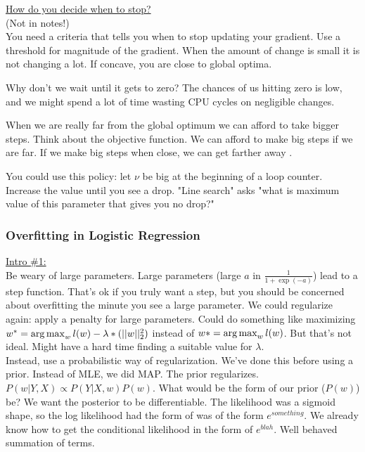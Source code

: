 \underline{How do you decide when to stop?} \hfill \\
(Not in notes!) \hfill \\

You need a criteria that tells you when to stop updating your gradient. 
	Use a threshold for magnitude of the gradient. 
	When the amount of change is small it is not changing a lot.  If concave, you are close to global optima. 

Why don't we wait until it gets to zero? 
	The chances of us hitting zero is low, and we might spend a lot of time wasting CPU cycles on negligible changes. 
	
When we are really far from the global optimum we can afford to take bigger steps. 
	Think about the objective function.  We can afford to make big steps if we are far.  
	If we make big steps when close, we can get farther away .

You could use this policy: let $\nu$ be big at the beginning of a loop counter. 
	Increase the value until you see a drop.
	"Line search" asks "what is maximum value of this parameter that gives you no drop?"  


\subsubsection{Overfitting in Logistic Regression}
 
 \underline{Intro \#1:}  \hfill \\
Be weary of large parameters.  %
	Large parameters (large $a$ in $\frac{1}{1 + \exp(-a)}$) lead to a step function.  
	That's ok if you truly want a step, but you should be concerned about overfitting the minute you see a large parameter.
	We could regularize again: apply a penalty for large parameters. 
    	Could do something like maximizing $w^* = \operatorname*{arg\,max}_w l(w) - \lambda*(||w||_2^2)$ instead of $w* =  \operatorname*{arg\,max}_w l(w)$. 
	But that's not ideal.  Might have a hard time finding a suitable value for $\lambda$.  \hfill \\
	
	
Instead, use a probabilistic way of regularization.
	We've done this before using a prior.  
	Instead of MLE, we did MAP. The prior regularizes. 
	$P(w | Y, X) \propto P(Y | X,w)P(w)$.
	What would be the form of our prior ($P(w)$) be? 
	We want the posterior to be differentiable.  
	The likelihood was a sigmoid shape, so the log likelihood had the form of was of the form $e^{something}$.
	We already  know how to get the conditional likelihood in the form of $e^{blah}$.
	Well behaved summation of terms.   \hfill \\


